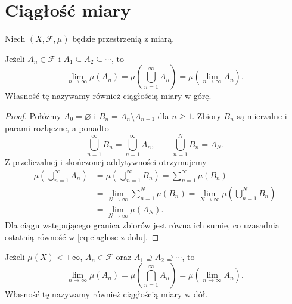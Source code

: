 \clearpage
{}
\section{Ciągłość miary}
\label{sec:ciaglosc-miary}

Niech $(X,\mathcal{F},\mu)$ będzie przestrzenią z miarą.

\begin{fakt}
\label{fakt:ciaglosc-z-dolu}
Jeżeli $A_n\in\mathcal{F}$ i $A_1\subseteq A_2\subseteq\cdots$, to
\begin{equation}
  \lim_{n\to\infty}\mu(A_n)
  =\mu\left(\bigcup_{n=1}^{\infty}A_n\right)
  =\mu\left(\lim_{n\to\infty}A_n\right).
  \label{eq:ciaglosc-z-dolu}
\end{equation}
Własność tę nazywamy również ciągłością miary w górę.
\end{fakt}

\begin{proof}
Połóżmy $A_0=\varnothing$ i $B_n=A_n\setminus A_{n-1}$ dla $n\geq1$.
Zbiory $B_n$ są mierzalne i parami rozłączne, a ponadto
\[
  \bigcup_{n=1}^{\infty}B_n=\bigcup_{n=1}^{\infty}A_n,
  \qquad \bigcup_{n=1}^{N}B_n=A_N.
\]
Z przeliczalnej i skończonej addytywności otrzymujemy
\begin{align*}
  \mu\left(\bigcup_{n=1}^{\infty}A_n\right)
    &=\mu\left(\bigcup_{n=1}^{\infty}B_n\right)
      =\sum_{n=1}^{\infty}\mu(B_n)\\
    &=\lim_{N\to\infty}\sum_{n=1}^{N}\mu(B_n)
      =\lim_{N\to\infty}\mu\left(\bigcup_{n=1}^{N}B_n\right)\\
    &=\lim_{N\to\infty}\mu(A_N).
\end{align*}
Dla ciągu wstępującego granica zbiorów jest równa ich sumie,
co uzasadnia ostatnią równość w \eqref{eq:ciaglosc-z-dolu}.
\end{proof}

\begin{fakt}
\label{fakt:ciaglosc-z-gory}
Jeżeli $\mu(X)<+\infty$, $A_n\in\mathcal{F}$ oraz
$A_1\supseteq A_2\supseteq\cdots$, to
\begin{equation}
  \lim_{n\to\infty}\mu(A_n)
  =\mu\left(\bigcap_{n=1}^{\infty}A_n\right)
  =\mu\left(\lim_{n\to\infty}A_n\right).
  \label{eq:ciaglosc-z-gory}
\end{equation}
Własność tę nazywamy również ciągłością miary w dół.
\end{fakt}

